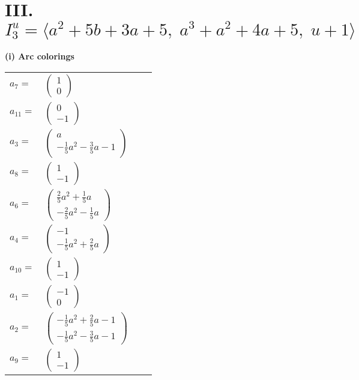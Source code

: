 \documentclass[1p]{elsarticle_modified}
\theoremstyle{definition}
\begin{document}
\centering \section*{III. $I^u_{3}= \langle a^2+5 b+3 a+5,\;a^3+a^2+4 a+5,\;u+1 \rangle$}
\flushleft \textbf{(i) Arc colorings}\\
\begin{tabular}{m{7pt} m{180pt} m{7pt} m{180pt} }
\flushright $a_{7}=$&$\begin{pmatrix}1\\0\end{pmatrix}$ \\
\flushright $a_{11}=$&$\begin{pmatrix}0\\-1\end{pmatrix}$ \\
\flushright $a_{3}=$&$\begin{pmatrix}a\\-\frac{1}{5} a^2-\frac{3}{5} a-1\end{pmatrix}$ \\
\flushright $a_{8}=$&$\begin{pmatrix}1\\-1\end{pmatrix}$ \\
\flushright $a_{6}=$&$\begin{pmatrix}\frac{2}{5} a^2+\frac{1}{5} a\\-\frac{2}{5} a^2-\frac{1}{5} a\end{pmatrix}$ \\
\flushright $a_{4}=$&$\begin{pmatrix}-1\\-\frac{1}{5} a^2+\frac{2}{5} a\end{pmatrix}$ \\
\flushright $a_{10}=$&$\begin{pmatrix}1\\-1\end{pmatrix}$ \\
\flushright $a_{1}=$&$\begin{pmatrix}-1\\0\end{pmatrix}$ \\
\flushright $a_{2}=$&$\begin{pmatrix}-\frac{1}{5} a^2+\frac{2}{5} a-1\\-\frac{1}{5} a^2-\frac{3}{5} a-1\end{pmatrix}$ \\
\flushright $a_{9}=$&$\begin{pmatrix}1\\-1\end{pmatrix}$ \\

\end{tabular}
\end{document}
